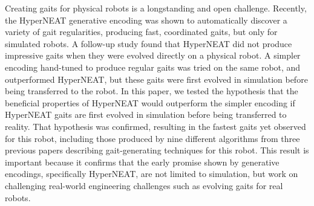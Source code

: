 Creating gaits for physical robots is a longstanding and open challenge. 
Recently, the HyperNEAT generative encoding was shown to automatically discover  a variety of gait regularities, producing fast, coordinated gaits, but only for simulated robots. A follow-up study found that HyperNEAT did not produce impressive gaits when they were evolved directly on a physical robot. A simpler encoding hand-tuned to produce regular gaits was tried on the same robot, and outperformed HyperNEAT, but these gaits were first evolved in simulation before being transferred to the robot. In this paper, we tested the hypothesis that the beneficial properties of HyperNEAT would outperform the simpler encoding if HyperNEAT gaits are first evolved in simulation before being transferred to reality. 
That hypothesis was confirmed, resulting in the fastest gaits yet observed for this robot, including those produced by nine different algorithms from three previous papers describing gait-generating techniques for this robot. This result is important because it confirms that the early promise shown by generative encodings, specifically HyperNEAT, are not limited to simulation, but work on challenging real-world engineering challenges such as evolving gaits for real robots. 




%
